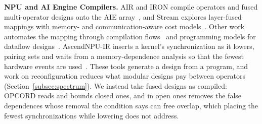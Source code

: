 \textbf{NPU and AI Engine Compilers.}
AIR and IRON compile operators and fused multi-operator designs onto the AIE array~\citep{wang2026mlirair,hunhoff2025iron}, and Stream explores layer-fused mappings with memory- and communication-aware cost models~\citep{symons2025stream}.
Other work automates the mapping through compilation flows~\citep{zhuang2025aries,danopoulos2025aie4ml} and programming models for dataflow designs~\citep{chen2024allo,fang2025dato}.
AscendNPU-IR inserts a kernel's synchronization as it lowers, pairing sets and waits from a memory-dependence analysis so that the fewest hardware events are used~\citep{ascend-autosync}.
These tools generate a design from a program, and work on reconfiguration reduces what modular designs pay between operators (Section~\ref{subsec:spectrum}).
We instead take fused designs as compiled: OPCORD reads and bounds closed ones, and in open ones removes the false dependences whose removal the condition says can free overlap, which placing the fewest synchronizations while lowering does not address.

